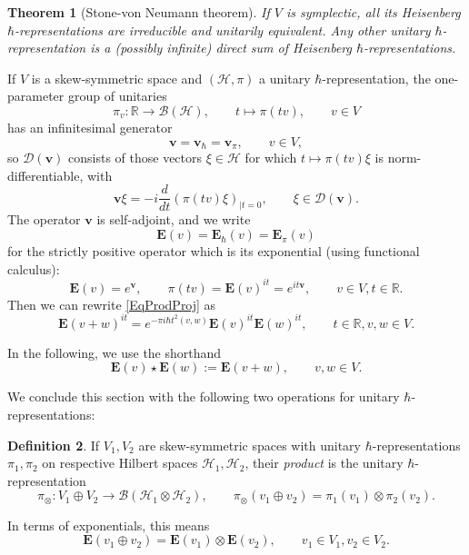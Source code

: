 \documentclass[11pt, reqno]{amsart}
\newtheorem{theorem}{Theorem}[section]
\theoremstyle{definition}
\newtheorem{defn}[theorem]{Definition}
\numberwithin{equation}{section}
\def\msD{\mathscr D}
\def\R{\mathbb R}
\newcommand{\Hsp}{\mathcal{H}}
\newcommand{\Bc}{\mathcal{B}}
\newcommand{\vb}{\mathbf{v}}
\newcommand{\eb}{\mathbf{E}}
\begin{document}
\begin{theorem}[Stone-von Neumann theorem] If $V$ is symplectic, all its Heisenberg $\hbar$-representations are irreducible and unitarily equivalent. Any other unitary $\hbar$-representation is a (possibly infinite) direct sum of Heisenberg $\hbar$-representations.
\end{theorem}

If $V$ is a skew-symmetric space and $(\Hsp,\pi)$ a unitary $\hbar$-representation,  the one-parameter group of unitaries 
\[
\pi_v \colon \R\rightarrow\Bc(\Hsp),\qquad t \mapsto \pi(tv),\qquad v\in V
\] 
has an infinitesimal generator 
\[
\vb = \vb_{\hbar} = \vb_{\pi},\qquad v\in V,
\]
so $\msD(\vb)$ consists of those vectors $\xi\in \Hsp$ for which $t \mapsto \pi(tv)\xi$ is norm-differentiable, with
\[
\vb \xi = -i \frac{d}{dt}(\pi(tv)\xi)_{\mid t=0},\qquad \xi\in \msD(\vb).
\]
The operator $\vb$ is self-adjoint, and we write
\begin{equation}
\eb(v) = \eb_{\hbar}(v) = \eb_{\pi}(v)
\end{equation}
for the strictly positive operator which is its exponential (using functional calculus):
\begin{equation}\label{EqExponentialpi}
\eb(v) = e^\vb,\qquad \pi(tv) = \eb(v)^{it} =  e^{it\vb},\qquad v\in V,t\in \R.
\end{equation}
Then we can rewrite \eqref{EqProdProj} as
\begin{equation}\label{EqProdY}
\eb(v+w)^{it} = e^{-\pi i \hbar t^2 (v,w)}\eb(v)^{it}\eb(w)^{it},\qquad t\in\R,v,w\in V.
\end{equation}

In the following, we use the shorthand
\begin{equation}\label{EqProdRule}
\eb(v)\star\eb(w) := \eb(v+w),\qquad v,w\in V.
\end{equation}


We conclude this section with the following two operations for unitary $\hbar$-representations:
\begin{defn}
If $V_1,V_2$ are skew-symmetric spaces with unitary $\hbar$-representations $\pi_1,\pi_2$ on respective Hilbert spaces $\Hsp_1,\Hsp_2$, their \emph{product} is the unitary $\hbar$-representation 
\begin{equation}\label{EqDirSumRepUnit}
\pi_{\otimes}\colon V_1\oplus V_2 \rightarrow \Bc(\Hsp_1 \otimes \Hsp_2) ,\qquad \pi_{\otimes}(v_1\oplus v_2) = \pi_1(v_1) \otimes \pi_2(v_2).
\end{equation}
\end{defn}
In terms of exponentials, this means
\begin{equation}\label{EqDirSumRep}
\eb(v_1\oplus v_2) = \eb(v_1)\otimes \eb(v_2),\qquad v_1\in V_1,v_2\in V_2.
\end{equation}
\end{document}
